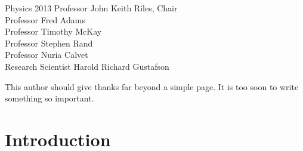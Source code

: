 \documentclass[leqno]{report}
\theoremstyle{plain}
\theoremstyle{definition}
\theoremstyle{remark}
\numberwithin{theorem}{chapter}        %
\begin{document}





{Physics} {2013}
{ Professor John Keith Riles, Chair \\
  Professor Fred Adams\\
  Professor Timothy McKay\\
  Professor Stephen Rand\\
  Professor Nuria Calvet\\
  Research Scientist Harold Richard Gustafson }



\initializefrontsections

{}

\setcounter{page}{1}


\startacknowledgementspage

This author should give thanks far beyond a simple page. It is too soon to write something so important.



\tableofcontents
\listoffigures

\startthechapters 


\chapter{Introduction}
\label{intro} 

\end{document}
